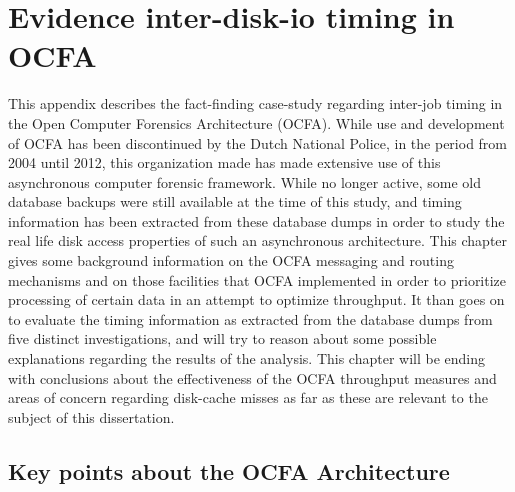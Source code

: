 \chapter{Evidence inter-disk-io timing in OCFA}
This appendix describes the fact-finding case-study regarding inter-job timing in the Open Computer Forensics Architecture (OCFA). While use and development of OCFA has been discontinued by the Dutch National Police, in the period from 2004 until 2012, this organization made has made extensive use of this asynchronous computer forensic framework. While no longer active, some old database backups were still available at the time of this study, and timing information has been extracted from these database dumps in order to study the real life disk access properties of such an asynchronous architecture. This chapter gives some background information on the OCFA messaging and routing mechanisms and on those facilities that OCFA implemented in order to prioritize processing of certain data in an attempt to optimize throughput. It than goes on to evaluate the timing information as extracted from the database dumps from five distinct investigations, and will try to reason about some possible explanations regarding the results of the analysis. This chapter will be ending with conclusions about the effectiveness of the OCFA throughput measures and areas of concern regarding disk-cache misses as far as these are relevant to the subject of this dissertation.
\section{Key points about the OCFA Architecture}

